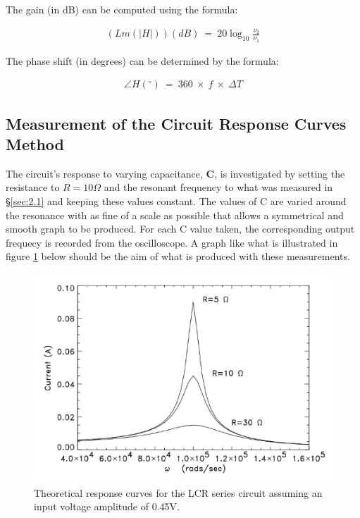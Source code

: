 \documentclass[12pt]{article}
\begin{document}
The gain (in dB) can be computed using the formula:

\begin{gather} \label{eq:13}
    (Lm(\lvert H \rvert))(dB) \: = \: 20 \log_{10} \frac{\nu_2}{\nu_1}
\end{gather}

The phase shift (in degrees) can be determined by the formula:

\begin{gather} \label{eq:14}
    \angle H (^{\circ}) \: = \: 360 \: \times \: f \: \times \: \Delta T
\end{gather}

\subsection{Measurement of the Circuit Response Curves Method} \label{sec:2.3}

The circuit's response to varying capacitance, \textbf{C}, is investigated by setting the resistance to $R= 10 \Omega$ and the resonant frequency to what was measured in §\ref{sec:2.1} and keeping these values constant.
The values of C are varied around the resonance with as fine of a scale as possible that allows a symmetrical and smooth graph to be produced. For each C value taken, the corresponding output frequecy is recorded from the oscilloscope.
A graph like what is illustrated in figure \ref{fig:lcrresponsecurve} below should be the aim of what is produced with these measurements.

\begin{figure}[H]
    \centering
    \includegraphics[width=15cm]{graph LCR goof.png}
    \caption{\centering Theoretical response curves for the LCR series circuit assuming an input voltage amplitude of 0.45V. \protect\cite{UCDlcr}}
    \label{fig:lcrresponsecurve}
\end{figure}
\end{document}
